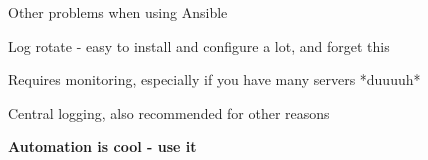 \documentclass[18pt,landscape,a4paper,footrule]{foils}
\begin{document}
Other problems when using Ansible

\begin{list2}
\item Log rotate - easy to install and configure a lot, and forget this
\item Requires monitoring, especially if you have many servers *duuuuh*
\item Central logging, also recommended for other reasons
\end{list2}



\begin{center}
\vskip 5mm
{\color{titlecolor}\LARGE \bf Automation is cool - use it}
\vskip 5mm

\end{center}
\end{document}
